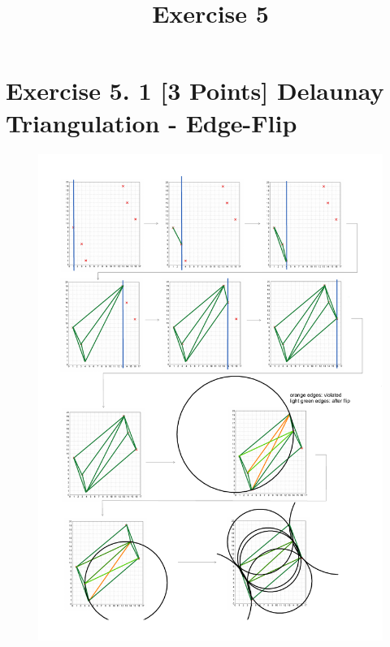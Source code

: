 \documentclass[a4paper]{article}
\date{}
\author{}
\title{Exercise 5}
\begin{document}
\maketitle 
\thispagestyle{fancy}



\section*{Exercise 5. 1 [3 Points] Delaunay Triangulation - Edge-Flip}

\begin{figure}[h!]
	\centering
	\includegraphics[width=0.79\linewidth]{delaunay.pdf}
	\label{fig:delaunay}
\end{figure}

\clearpage
\end{document}
